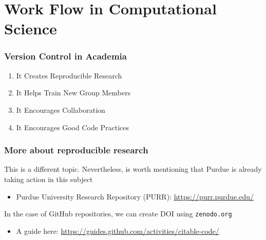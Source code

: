 
\section[Work Flow]{Work Flow in Computational Science}

\begin{frame}
\frametitle{\large{Version Control in Academia}}
\begin{enumerate}
\item It Creates Reproducible Research
\item It Helps Train New Group Members
\item It Encourages Collaboration
\item It Encourages Good Code Practices
\end{enumerate}
\end{frame}
\note{}

\begin{frame}
\frametitle{\large{More about reproducible research}}
This is a different topic. Nevertheless, is worth mentioning that Purdue is already taking action in this subject
\begin{itemize}
\item  Purdue University Research Repository (PURR): \url{https://purr.purdue.edu/}
\end{itemize}

In the case of GitHub repositories, we can create DOI using \texttt{zenodo.org}
\begin{itemize}
\item A guide here: \url{https://guides.github.com/activities/citable-code/}
\end{itemize}
\end{frame}
\note{}

